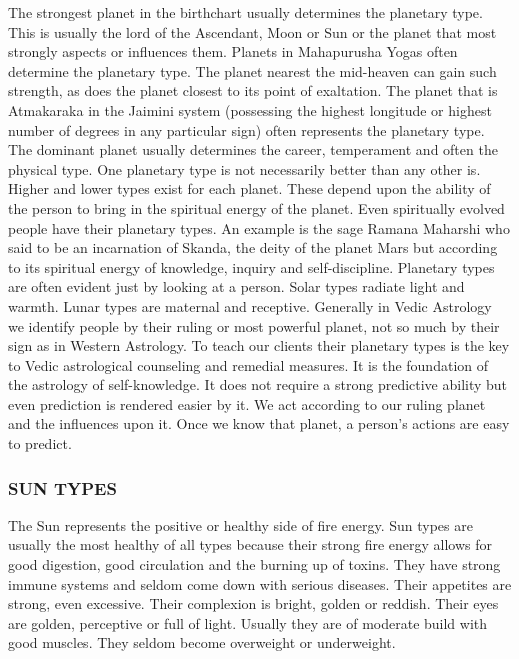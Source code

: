 The strongest planet in the birthchart usually determines the planetary type. This is usually the lord of the Ascendant, Moon or Sun or the planet that most strongly aspects or influences them. 
Planets in Mahapurusha Yogas often determine the planetary type. The planet nearest the mid-heaven can gain such strength, as does the planet closest to its point of exaltation. The planet that is Atmakaraka in the Jaimini system (possessing the highest longitude or highest number of degrees in any particular sign) often represents the planetary type. The dominant planet usually determines the career, temperament and often the physical type.
One planetary type is not necessarily better than any other is. Higher and lower types exist for each planet. These depend upon the ability of the person to bring in the spiritual energy of the planet. Even spiritually evolved people have their planetary types. An example is the sage Ramana Maharshi who said to be an incarnation of Skanda, the deity of the planet Mars but according to its spiritual energy of knowledge, inquiry and self-discipline.
Planetary types are often evident just by looking at a person. Solar types radiate light and warmth. Lunar types are maternal and receptive. Generally in Vedic Astrology we identify people by their ruling or most powerful planet, not so much by their sign as in Western Astrology.
To teach our clients their planetary types is the key to Vedic astrological counseling and remedial measures. It is the foundation of the astrology of self-knowledge. It does not require a strong predictive ability but even prediction is rendered easier by it. We act according to our ruling planet and the influences upon it. Once we know that planet, a person’s actions are easy to predict.
 



\subsubsection{SUN TYPES}
 

The Sun represents the positive or healthy side of fire energy. Sun types are usually the most healthy of all types because their strong fire energy allows for good digestion, good circulation and the burning up of toxins. They have strong immune systems and seldom come down with serious diseases. Their appetites are strong, even excessive. Their complexion is bright, golden or reddish. Their eyes are golden, perceptive or full of light. Usually they are of moderate build with good muscles. They seldom become overweight or underweight.

